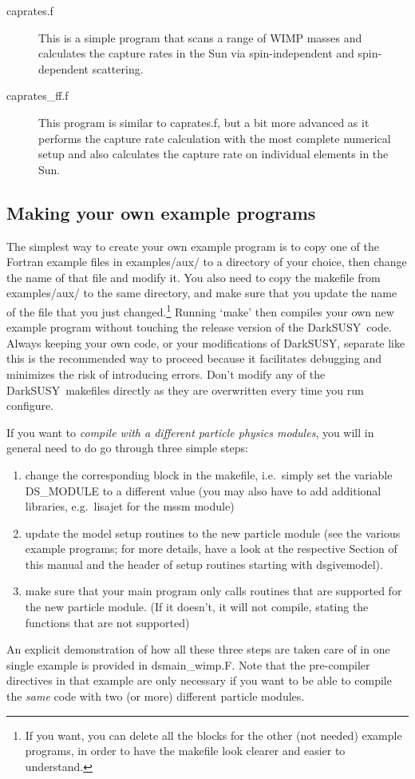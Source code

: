 \documentclass[a4paper,10pt,oneside]{book}
\newcommand{\code}[1]{\ft{#1}}
\newcommand{\ds}{{\sffamily DarkSUSY}}
\newcommand{\ft}[1]{\textsf{#1}}
\begin{document}
\begin{description}
\item[\code{caprates.f}] This is a simple program that scans a range of WIMP masses and calculates the capture rates in the Sun via spin-independent and spin-dependent scattering. 
\item[\code{caprates\_ff.f}] This program is similar to \code{caprates.f}, but a bit more advanced as it performs the capture rate calculation with the most complete numerical setup and also calculates the capture rate on individual elements in the Sun.
\end{description}



\subsection{Making your own example programs}
\label{sec:makeownmain}
The simplest way to create your own example program is to copy one of the Fortran example files 
in \code{examples/aux/} to a directory of your choice,  then change the name of that file and modify it. 
You also need to copy the makefile from \code{examples/aux/} to the same directory, 
and make sure that you update the name of the file that you just changed.\footnote{%
If you want, you can delete all the blocks for the other (not needed) example programs, in order 
to have the makefile look clearer and easier to understand.
}
Running `\code{make}' then compiles your own new example program without touching the release
version of the \ds\ code. Always keeping your own code, or your modifications of \ds, separate like this
is the recommended way to proceed because it facilitates debugging and minimizes the risk of 
introducing errors. Don't modify any of the \ds\ \code{makefile}s directly as they are overwritten every time you run \code{configure}.

\bigskip
\noindent
If you want to {\it compile with a different particle physics modules}, you will in general need to do go 
through three simple steps:
\begin{enumerate}
\item change the corresponding block in the makefile, i.e.~simply set the variable \code{DS\_MODULE} 
         to a different value (you may also have to add additional libraries, e.g.~\code{lisajet} for  the \code{mssm}
         module)
\item update the model setup routines to the new particle module (see the various example 
programs; for more details, have a look at the respective Section of this manual and the header of  setup
routines starting with \code{dsgivemodel}).
\item make sure that your main program only calls routines that are supported for the new particle module.
(If it doesn't, it will not compile, stating the functions that are not supported)
\end{enumerate}
An explicit demonstration of how all these three steps are taken care of in one single example is provided in \code{dsmain\_wimp.F}. 
Note that the pre-compiler 
directives in that example are only necessary if you want to be able to compile the {\it same} code 
with two (or more) different particle modules.
\end{document}
